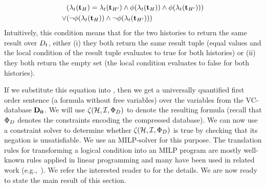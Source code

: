 \begin{align}
  \label{eq:db-equals-symbolic}
  \begin{split}
      &(\lambda_{t}(\mathbf{t}_{H}) = \lambda_{t}(\mathbf{t}_{H'}) \land  \phi(\lambda_{t}(\mathbf{t}_{H})) \land \phi(\lambda_{t}(\mathbf{t}_{H'})))\\
  \vee &(\neg \phi(\lambda_{t}(\mathbf{t}_{H})) \land \neg \phi(\lambda_{t}(\mathbf{t}_{H'})))
  \end{split}
\end{align}
%
Intuitively, this condition means that for the two histories to return the same result over $D_{t}$, either (i) they both return the same result tuple (equal values and the local condition of the result tuple evaluates to true for both histories) or (ii) they both return the empty set (the local condition evaluates to false for both histories).

If we substitute this equation into , then we get a universally quantified first order sentence (a formula without free variables) over the variables from the VC-database $\mathbf{D_0}$. We will use $\zeta({\mathcal{H}},{\mathcal{I}},{\Phi_{D}})$ to denote the resulting formula (recall that $\Phi_{D}$ denotes the constraints encoding the compressed database). We can now use a constraint solver to determine whether $\zeta({\mathcal{H}},{\mathcal{I}},{\Phi_{D}})$ is true by checking that its negation is unsatisfiable. We use an MILP-solver for this purpose. The translation rules for transforming a logical condition into an MILP program are mostly well-known rules applied in linear programming and many have been used in related work (e.g.,~\cite{MeliouS12}). We refer the interested reader to \cite{techreport} for the details.
  We are now ready to state the main result of this section.

